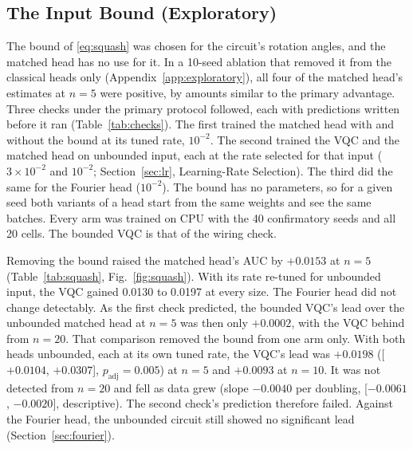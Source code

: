 \documentclass{ieeeaccess}
\newcommand{\vqc}{VQC}
\begin{document}
\subsection{The Input Bound (Exploratory)}
\label{sec:squash}
The bound of \eqref{eq:squash} was chosen for the circuit's rotation angles, and the matched head has no use for it. In a 10-seed ablation that removed it from the classical heads only (Appendix~\ref{app:exploratory}), all four of the matched head's estimates at $n=5$ were positive, by amounts similar to the primary advantage. Three checks under the primary protocol followed, each with predictions written before it ran (Table~\ref{tab:checks}). The first trained the matched head with and without the bound at its tuned rate, $10^{-2}$. The second trained the \vqc{} and the matched head on unbounded input, each at the rate selected for that input ($3\times10^{-2}$ and $10^{-2}$; Section~\ref{sec:lr}, Learning-Rate Selection). The third did the same for the Fourier head ($10^{-2}$). The bound has no parameters, so for a given seed both variants of a head start from the same weights and see the same batches. Every arm was trained on CPU with the 40 confirmatory seeds and all 20 cells. The bounded \vqc{} is that of the wiring check.

Removing the bound raised the matched head's AUC by $+0.0153$ at $n=5$ (Table~\ref{tab:squash}, Fig.~\ref{fig:squash}). With its rate re-tuned for unbounded input, the \vqc{} gained 0.0130 to 0.0197 at every size. The Fourier head did not change detectably. As the first check predicted, the bounded \vqc{}'s lead over the unbounded matched head at $n=5$ was then only $+0.0002$, with the \vqc{} behind from $n=20$. That comparison removed the bound from one arm only. With both heads unbounded, each at its own tuned rate, the \vqc{}'s lead was $+0.0198$ ([$+0.0104$, $+0.0307$], $p_{\mathrm{adj}}=0.005$) at $n=5$ and $+0.0093$ at $n=10$. It was not detected from $n=20$ and fell as data grew (slope $-0.0040$ per doubling, [$-0.0061$, $-0.0020$], descriptive). The second check's prediction therefore failed. Against the Fourier head, the unbounded circuit still showed no significant lead (Section~\ref{sec:fourier}).
\end{document}
